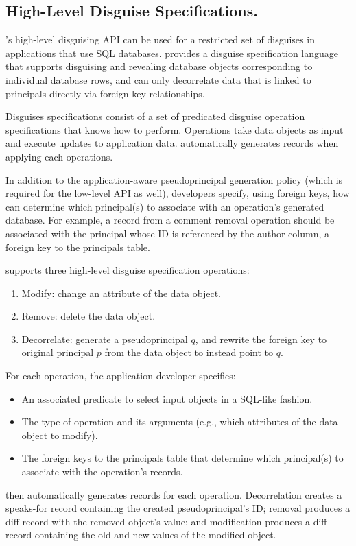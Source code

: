 \subsection{High-Level Disguise Specifications.} 
\sys's high-level disguising API can be used for a restricted set of disguises in applications that
use SQL databases. \sys provides a disguise specification language that supports disguising and
revealing database objects corresponding to individual database rows, and can only decorrelate data
that is linked to principals directly via foreign key relationships.

Disguises specifications consist of a set of predicated disguise operation specifications that \sys knows
how to perform.  Operations take data objects as input and execute updates to
application data. \sys automatically generates records when applying each operations.

In addition to the application-aware pseudoprincipal generation policy (which is required for the
low-level API as well), developers specify, using foreign keys, how \sys can determine which
principal(s) to associate with an operation's generated database. For example, a record from a
comment removal operation should be associated with the principal whose ID is referenced by the
author column, a foreign key to the principals table.

\vspace{6pt}\noindent
\sys supports three high-level disguise specification operations:
\begin{enumerate}
    \item Modify: change an attribute of the data object.
    \item Remove: delete the data object.
    \item Decorrelate: generate a pseudoprincipal $q$, and rewrite the foreign key to original
        principal $p$ from the data object to instead point to $q$.  
\end{enumerate}

\noindent For each operation, the application developer specifies:
\begin{itemize}
    \item An associated predicate to select input objects in a SQL-like fashion.
    \item The type of operation and its arguments (e.g., which attributes of the data object to
        modify).
    \item The foreign keys to the principals table that determine which principal(s) to associate
        with the operation's records.
\end{itemize}
%
\sys then automatically generates records for each operation.
Decorrelation creates a speaks-for record  containing the created pseudoprincipal's
ID; removal produces a diff record  with the removed object's value; and modification
produces a diff record  containing the old and new values of the modified object.

